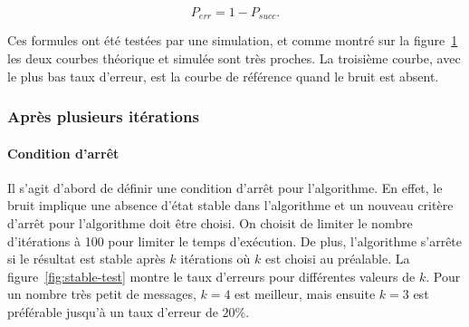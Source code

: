 \documentclass{gretsi}
\begin{document}
\begin{equation}
P_{err} = 1-P_{succ}.
\end{equation}

\begin{figure}[ht!]
\begin{center}
\end{center}
\label{fig:f1}
\end{figure}

Ces formules ont été testées par une simulation, et comme montré sur la figure~\ref{fig:f1} les deux courbes théorique et simulée sont très proches. La troisième courbe, avec le plus bas taux d'erreur, est la courbe de référence quand le bruit est absent.

\subsubsection{Après plusieurs itérations}

\paragraph{Condition d'arr\^et} Il s'agit d'abord de définir une condition d'arr\^et pour l'algorithme. En effet, le bruit implique une absence d'état stable dans l'algorithme et un nouveau critère d'arrêt pour l'algorithme doit être choisi. On choisit de limiter le nombre d'itérations à 100 pour limiter le temps d'exécution. De plus, l'algorithme s'arrête si le résultat est stable après $k$ itérations où $k$ est choisi au préalable. La figure~\ref{fig:stable-test} montre le taux d'erreurs pour différentes valeurs de $k$. Pour un nombre très petit de messages, $k=4$ est meilleur, mais ensuite $k=3$ est préférable jusqu'à un taux d'erreur de $20\%$.
\end{document}
